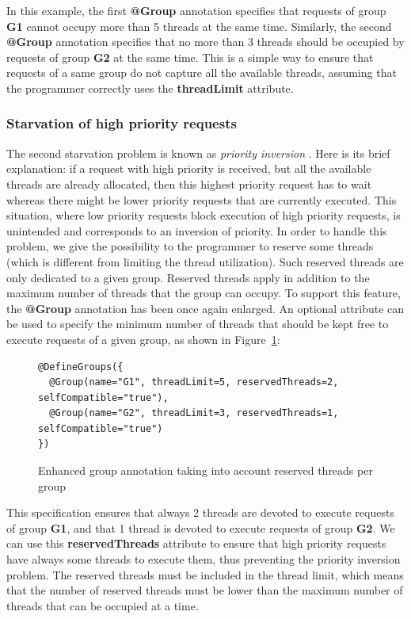 \documentclass[11pt]{report}
\begin{document}
In this example, the first \textbf{@Group} annotation specifies that requests of group \textbf{G1} cannot occupy more than 5 threads at the same time. Similarly, the second \textbf{@Group} annotation specifies that no more than 3 threads should be occupied by requests of group \textbf{G2} at the same time.
This is a simple way to ensure that requests of a same group do not capture all the available threads, assuming that the programmer correctly uses the \textbf{threadLimit} attribute.

\subsubsection{Starvation of high priority requests}
The second starvation problem is known as \emph{priority inversion} \cite{Lampson:1980:EPM:358818.358824}. Here is its brief explanation: if a request with high priority is received, but all the available threads are already allocated, then this highest priority request has to wait whereas there might be lower priority requests that are currently executed. This situation, where low priority requests block execution of high priority requests, is unintended and corresponds to an inversion of priority. In order to handle this problem, we give the possibility to the programmer to reserve some threads (which is different from limiting the thread utilization). Such reserved threads are only dedicated to a given group. Reserved threads apply in addition to the maximum number of threads that the group can occupy. To support this feature, the \textbf{@Group} annotation has been once again enlarged. An optional attribute can be used to specify the minimum number of threads that should be kept free to execute requests of a given group, as shown in Figure~\ref{fig:new_new_groups}:

\begin{figure}[!ht]
	\lstset{language=java, numbers=left, numberstyle=\tiny, stepnumber=1, numbersep=5pt, basicstyle=\footnotesize}
	\begin{lstlisting}[frame=single]
@DefineGroups({
  @Group(name="G1", threadLimit=5, reservedThreads=2, selfCompatible="true"),
  @Group(name="G2", threadLimit=3, reservedThreads=1, selfCompatible="true")
})
 	\end{lstlisting}
\caption{Enhanced group annotation taking into account reserved threads per group}
\label{fig:new_new_groups}
\end{figure}

This specification ensures that always 2 threads are devoted to execute requests of group \textbf{G1}, and that 1 thread is devoted to execute requests of group \textbf{G2}. We can use this \textbf{reservedThreads} attribute to ensure that high priority requests have always some threads to execute them, thus preventing the priority inversion problem.
The reserved threads must be included in the thread limit, which means that the number of reserved threads must be lower than the maximum number of threads that can be occupied at a time.
\end{document}
